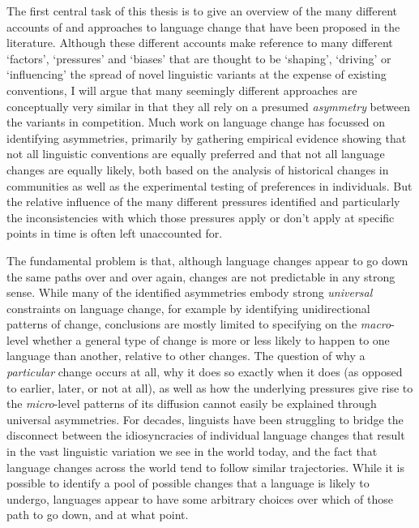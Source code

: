 The first central task of this thesis is to give an overview of the many different accounts of and approaches to language change that have been proposed in the literature. Although these different accounts make reference to many different `factors', `pressures' and `biases' that are thought to be `shaping', `driving' or `influencing' the spread of novel linguistic variants at the expense of existing conventions, I will argue that many seemingly different approaches are conceptually very similar in that they all rely on a presumed \emph{asymmetry} between the variants in competition.
Much work on language change has focussed on identifying asymmetries, primarily by gathering empirical evidence showing that not all linguistic conventions are equally preferred and that not all language changes are equally likely, both based on the analysis of historical changes in communities as well as the experimental testing of preferences in individuals. 
But the relative influence of the many different pressures identified and particularly the inconsistencies with which those pressures apply or don't apply at specific points in time is often left unaccounted for.

The fundamental problem is that, although language changes appear to go down the same paths over and over again, changes are not predictable in any strong sense.
While many of the identified asymmetries embody strong \emph{universal} constraints on language change, for example by identifying unidirectional patterns of change, conclusions are mostly limited to specifying on the \emph{macro}-level whether a general type of change is more or less likely to happen to one language than another, relative to other changes.
The question of why a \emph{particular} change occurs at all, why it does so exactly when it does (as opposed to earlier, later, or not at all), as well as how the underlying pressures give rise to the \emph{micro}-level patterns of its diffusion cannot easily be explained through universal asymmetries.
For decades, linguists have been struggling to bridge the disconnect between the idiosyncracies of individual language changes that result in the vast linguistic variation we see in the world today, and the fact that language changes across the world tend to follow similar trajectories.
While it is possible to identify a pool of possible changes that a language is likely to undergo, languages appear to have some arbitrary choices over which of those path to go down, and at what point.

